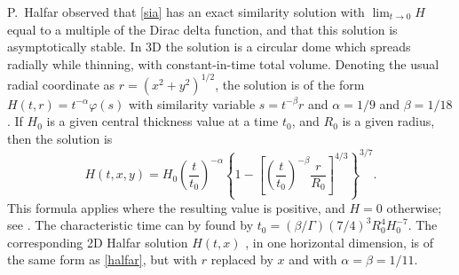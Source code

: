 \documentclass[letterpaper,final,12pt,reqno]{amsart}
\begin{document}
P.~Halfar \cite{Halfar1981} observed that \eqref{sia} has an exact similarity solution with $\lim_{t\to 0} H$ equal to a multiple of the Dirac delta function, and that this solution is asymptotically stable.  In 3D \cite{Halfar1983} the solution is a circular dome which spreads radially while thinning, with constant-in-time total volume.  Denoting the usual radial coordinate as $r=(x^2+y^2)^{1/2}$, the solution is of the form $H(t,r) = t^{-\alpha} \varphi(s)$ with similarity variable $s=t^{-\beta} r$ and $\alpha=1/9$ and $\beta=1/18$.  If $H_0$ is a given central thickness value at a time $t_0$, and $R_0$ is a given radius, then the solution is
\begin{equation}
H(t,x,y) = H_0 \left(\frac{t}{t_0}\right)^{-\alpha} \left\{1 - \left[\left(\frac{t}{t_0}\right)^{-\beta} \frac{r}{R_0}\right]^{4/3}\right\}^{3/7}. \label{halfar}
\end{equation}
This formula applies where the resulting value is positive, and $H=0$ otherwise; see \cite{Bueleretal2005}.  The characteristic time can by found by $t_0 = (\beta/\Gamma) (7/4)^3 R_0^4 H_0^{-7}$.  The corresponding 2D Halfar solution $H(t,x)$ \cite{Halfar1981}, in one horizontal dimension, is of the same form as \eqref{halfar}, but with $r$ replaced by $x$ and with $\alpha=\beta=1/11$.

\small

\bigskip


\end{document}
